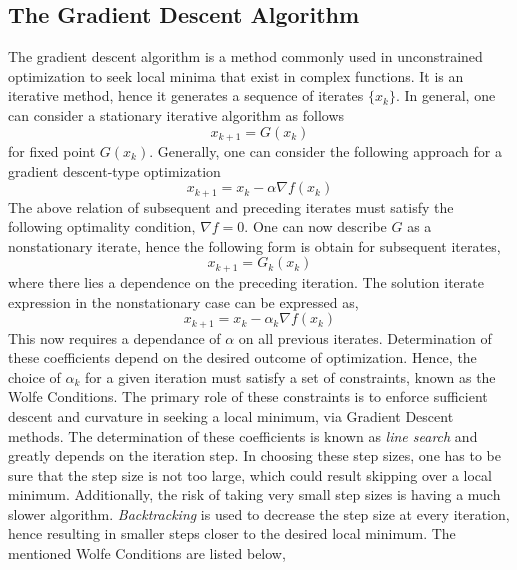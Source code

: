 \documentclass{article}
\begin{document}
\subsection*{The Gradient Descent Algorithm} 

The gradient descent algorithm is a method commonly used in unconstrained optimization to seek local minima that exist in complex functions.  It is an iterative method, hence it generates a sequence of iterates $\{x_{k} \} $. In general, one can consider a stationary iterative algorithm  as follows 
\begin{equation}
 x_{k+1} = G(x_{k})  
 \end{equation} 
 for fixed point $G(x_{k})$.  
 Generally, one can consider the following approach for a gradient descent-type optimization 
 \begin{equation} 
 x_{k+1} = x_{k} - \alpha \nabla f(x_{k})  
 \end{equation} 
 The above relation of subsequent and preceding iterates must satisfy the following optimality condition, $\nabla f =0 $.  One can now describe $G$ as a nonstationary iterate, hence the following form is obtain for subsequent iterates, 
 \begin{equation}
 x_{k+1} = G_{k}(x_{k})  
 \end{equation}
 where there lies a dependence on the preceding iteration. The solution iterate expression in the nonstationary case can be expressed as, 
 \begin{equation} 
 x_{k+1} = x_{k} - \alpha_{k} \nabla f(x_{k})  
 \end{equation} 
 This now requires a dependance of $\alpha$ on all previous iterates. Determination of these coefficients depend on the desired outcome of optimization. Hence, the choice of $\alpha_{k}$ for a given iteration must satisfy a set of constraints, known as the Wolfe Conditions. The primary role of these constraints is to enforce sufficient descent and curvature in seeking a local minimum, via Gradient Descent methods. The determination of these coefficients is known as \emph{line search} and greatly depends on the iteration step.  In choosing these step sizes, one  has to be sure that the step size is not too large, which could result skipping over a local  minimum. Additionally, the risk of taking very small step sizes is having a much slower algorithm. \emph{Backtracking} is used to decrease the  step size at every iteration, hence resulting in smaller steps closer to the desired local minimum. The mentioned Wolfe Conditions are listed below, 
\end{document}
